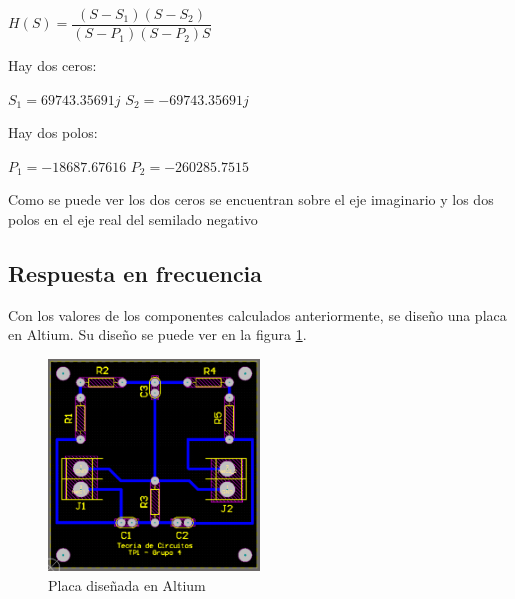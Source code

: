 \documentclass[12pt,a4paper]{article}
\begin{document}
\begin{center}
    $H(S) = \dfrac{(S-S_{1})(S-S_{2})}{(S-P_{1})(S-P_{2})S}$  \\
\end{center}

Hay dos ceros:
\begin{center}
    $S_{1}=69743.35691j $
    $S_{2}=-69743.35691j $
    \end{center}

Hay dos polos:

\begin{center}
    $P_{1}=-18687.67616$
    $P_{2}=-260285.7515$
\end{center}

Como se puede ver los dos ceros se encuentran sobre el eje imaginario y los dos polos en el eje real del semilado negativo


\begin{center}
    \end{center}

\subsection{Respuesta en frecuencia}
Con los valores de los componentes calculados anteriormente, se diseño una placa en Altium. Su diseño se 
puede ver en la figura \ref{fig:placa_altium}.

\begin{figure}[H]                                                       
    \centering\includegraphics[width=0.5\textwidth]{placa_altium.png}
    \caption{Placa diseñada en Altium}
    \label{fig:placa_altium}
    \end{figure}
\end{document}
